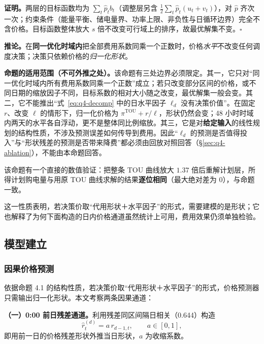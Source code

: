 \textbf{证明。}两层的目标函数均为 $\sum_t \hat p_t b_t$（调整层另含 $\tfrac12\sum_t\hat p_t(u_t+v_t)$），对 $\hat p$ 齐次一次；约束条件（能量平衡、储电量界、功率上限、非负性与日循环边界）完全不含价格。目标函数整体放大 $s$ 倍不改变可行域上的排序，故最优解集不变。$\square$

\textbf{推论。}在\textbf{同一优化时域内}把全部费用系数同乘一个正数时，价格\emph{水平}不改变任何调度决策；决策只依赖价格的\emph{归一化形状}。

\textbf{命题的适用范围（不可外推之处）。}该命题有三处边界必须限定。其一，它只对``同一优化时域内所有费用系数同乘一个正数''成立；若只改变部分区间的价格，或不同日期的缩放因子不同，目标系数的相对大小随之改变，最优解集一般会变。其二，它不能推出``式~\eqref{eq:q4-decomp} 中的日水平因子 $\ell_d$ 没有决策价值''。在固定 $r$、改变 $\ell$ 的情形下，归一化价格为 $\pi^{\mathrm{TOU}}+r/\ell$，形状仍然会变；48 小时时域内两天的水平各自浮动，更不是整体同比例缩放。其三，它是对\textbf{给定输入}的线性规划的结构性质，不涉及预测误差如何传导到费用。因此``$\ell_d$ 的预测是否值得投入''与``形状残差的预测是否带来降费''都必须由回放对照回答（\S\ref{sec:q4-ablation}），不能由本命题回答。

该命题有一个直接的数值验证：把整条 TOU 曲线放大 $1.37$ 倍后重解计划层，所得计划购电量与用原 TOU 曲线求解的结果\textbf{逐位相同}（最大绝对差为 0），与命题一致。

这一性质表明，若决策价取``代用形状＋水平因子''的形式，需要建模的是形状；它也解释了为何下面构造的日内价格通道虽然统计上可用，费用效果仍须单独检验。

\subsection{模型建立}
\label{sec:q4-model}

\subsubsection{因果价格预测}

依据命题 4.1 的结构性质，若决策价取``代用形状＋水平因子''的形式，价格预测器只需输出归一化形状。本文考察两条因果通道：

\textbf{（一）0:00 前日残差通道。}利用残差同区间隔日相关（0.644）构造
\begin{equation}
  \hat r_t^{(d)}=a\,r_{d-1,t},\qquad a\in[0,1],
\end{equation}
即用前一日的价格残差形状外推当日形状，$a$ 为收缩系数。

